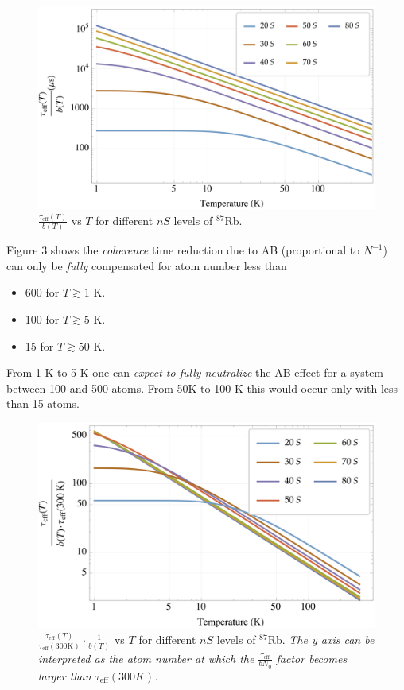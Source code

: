 \documentclass[10pt,twocolumn]{article}
\begin{document}
\begin{figure}[!h]
\includegraphics[scale=0.675]{tbloglog.png} \caption{$\frac{\tau_{\text{eff}}(T)}{b(T)}$ vs $T$ for different $nS$ levels of $^{87}$Rb.}
\end{figure}

Figure 3 shows the \textit{coherence} time reduction due to AB (proportional to $N^{-1}$) can only be \textit{fully} compensated for atom number less than

\begin{itemize}
\item 600 for $T\gtrsim 1$ K.
\item 100 for $T\gtrsim 5$ K.
\item 15 for $T\gtrsim 50$ K.
\end{itemize}
 
 From 1 K to 5 K one can \textit{expect to fully neutralize} the AB effect for a system between 100 and 500 atoms. From 50K to 100 K this would occur only with less than 15 atoms.
 
\begin{figure}[!h]
\includegraphics[scale=0.7]{tbtloglog.png} \caption{$\frac{\tau_{\text{eff}}(T)}{\tau_{\text{eff}}(300 \text{K})}\cdot\frac{1}{b(T)}$ vs $T$ for different $nS$ levels of $^{87}$Rb. \textit{The y axis can be interpreted as the atom number at which the $\frac{\tau_{\text{eff}}}{bN_0}$ factor becomes larger than $\tau_{\text{eff}}(300 K)$.}}
\end{figure}
\end{document}
